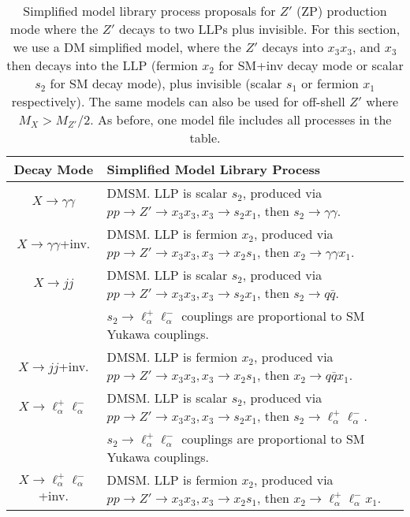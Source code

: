 \begin{table}
\begin{center}
\begin{tabular}{ |c|l|} 
 \hline
Decay Mode & Simplified Model Library Process \\
\hline\hline
$X\rightarrow \gamma\gamma$ & DMSM. LLP is scalar $s_2$, produced via $p p \rightarrow Z' \rightarrow x_3 x_3, x_3 \rightarrow s_2 x_1$, then $ s_2 \rightarrow \gamma \gamma$. \\
\hline
$X\rightarrow \gamma\gamma$+inv. &  DMSM. LLP is fermion $x_2$, produced via $p p \rightarrow Z' \rightarrow x_3 x_3, x_3 \rightarrow x_2 s_1$, then $ x_2 \rightarrow \gamma \gamma x_1$.    \\
\hline
$X\rightarrow jj$& DMSM. LLP is scalar $s_2$, produced via $p p \rightarrow Z' \rightarrow x_3 x_3, x_3 \rightarrow s_2 x_1$, then $s_2 \rightarrow q \bar q$.\\
& $s_2 \rightarrow \ell_\alpha^+\ell_\alpha^-$ couplings are proportional to SM Yukawa couplings.\\
\hline
$X\rightarrow jj$+inv.& DMSM. LLP is fermion $x_2$, produced via $p p \rightarrow Z' \rightarrow x_3 x_3, x_3 \rightarrow x_2 s_1$, then $x_2 \rightarrow q \bar q x_1$.\\
\hline
$X\rightarrow \ell_\alpha^+\ell_\alpha^-$ &  DMSM. LLP is scalar $s_2$, produced via $p p \rightarrow Z' \rightarrow x_3 x_3, x_3 \rightarrow s_2 x_1$, then $s_2 \rightarrow \ell_\alpha^+\ell_\alpha^-$.\\
& $s_2 \rightarrow \ell_\alpha^+\ell_\alpha^-$ couplings are proportional to SM Yukawa couplings.\\
\hline
$X\rightarrow \ell_\alpha^+\ell_\alpha^-$+inv. &   DMSM. LLP is fermion $x_2$, produced via $p p \rightarrow Z' \rightarrow x_3 x_3, x_3 \rightarrow x_2 s_1$, then $x_2 \rightarrow \ell_\alpha^+\ell_\alpha^- x_1$.\\

\hline
\end{tabular}
\end{center}
\caption{Simplified model library process proposals for $Z'$ (ZP) production mode where the $Z'$ decays to two LLPs plus invisible. For this section, we  use a DM simplified model, where the $Z'$ decays into $x_3 x_3$, and $x_3$ then decays into the LLP (fermion $x_2$ for SM+inv decay mode or scalar $s_2$ for SM decay mode), plus invisible (scalar $s_1$ or fermion $x_1$ respectively).  The same models can also be used for off-shell $Z'$ where $M_X > M_{Z'}/2$. As before, one model file includes all processes in the table.}\label{tab:Zp_inv_neutral_library}
\end{table}

